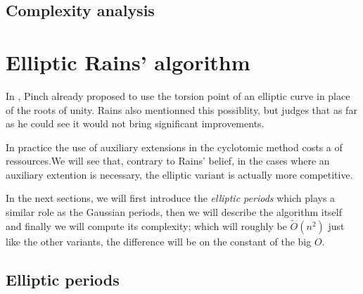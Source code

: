 \documentclass[12pt]{article}
\theoremstyle{plain}
\theoremstyle{definition}
\newcommand{\tildO}{\tilde{O}}
\newcounter{algorithm}
\begin{document}
\subsection{Complexity analysis}



\section{Elliptic Rains' algorithm}

In \cite{Pinch}, Pinch already proposed to use the torsion point of an elliptic
curve in place of the roots of unity. Rains also mentionned this possiblity, 
but judges that as far as he could see it would not bring significant 
improvements.
 
In practice the use of auxiliary extensions in the cyclotomic method costs a of
ressources.We will see that, contrary to Rains' belief, in the cases where an
auxiliary extention is necessary, the elliptic variant is actually more 
competitive.

In the next sections, we will first introduce the \emph{elliptic periods} which 
plays a similar role as the Gaussian periods, then we will describe the
algorithm itself and finally we will compute its complexity; which will
roughly be $\tildO(n^2)$ just like the other variants, the difference will be 
on the constant of the big $O$.

\subsection{Elliptic periods}
\end{document}
